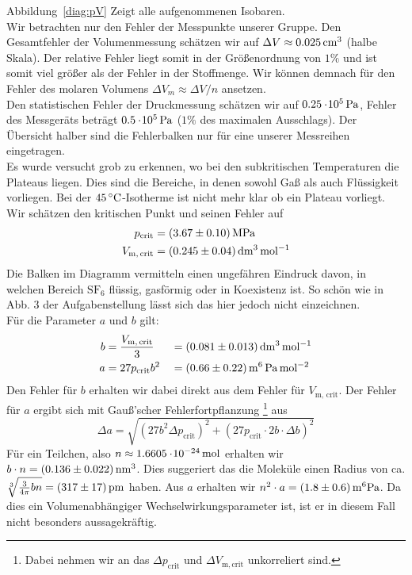 %
Abbildung~\ref{diag:pV} Zeigt alle aufgenommenen Isobaren. \\
%
Wir betrachten nur den Fehler der Messpunkte unserer Gruppe.
Den Gesamtfehler der Volumenmessung schätzen wir auf $\Delta V \approx \unit[0.025]{cm^3}$ (halbe Skala). Der relative Fehler liegt somit in der Größenordnung von $1\%$ und ist somit viel größer als der Fehler in der Stoffmenge. Wir können demnach für den Fehler des molaren Volumens $\Delta V_m \approx \Delta V / n$ ansetzen.\\
%
Den statistischen Fehler der Druckmessung schätzen wir auf $\unit[0.25 \e{5}]{Pa}$, Fehler des Messgeräts beträgt $\unit[0.5 \e5]{Pa}$ ($1\%$ des maximalen Ausschlags). 
Der Übersicht halber sind die Fehlerbalken nur für eine unserer Messreihen eingetragen.\\
%
Es wurde versucht grob zu erkennen, wo bei den subkritischen Temperaturen die Plateaus liegen. Dies sind die Bereiche, in denen sowohl Gaß als auch Flüssigkeit vorliegen. Bei der $\unit[45]{ ^\circ C}$-Isotherme ist nicht mehr klar ob ein Plateau vorliegt. Wir schätzen den kritischen Punkt und seinen Fehler auf
\begin{align*}
    p_\mathrm{crit} &= \unit[(3.67 \pm 0.10)]{MPa} \\
    V_\mathrm{m,\, crit} &= \unit[(0.245 \pm 0.04)]{dm^3\, mol^{-1}}
\end{align*}
%
Die Balken im Diagramm vermitteln einen ungefähren Eindruck davon, in welchen Bereich $\mathrm{S F_6}$ flüssig, gasförmig oder in Koexistenz ist. So schön wie in Abb. 3 der Aufgabenstellung lässt sich das hier jedoch nicht einzeichnen.\\
%
Für die Parameter $a$ und $b$ gilt:
%
\begin{alignat*}{3}
    b &= \frac{V_\mathrm{m,\, crit}}{3} &&= \unit[(0.081 \pm  0.013)]{dm^3\, mol^{-1}}\\
    a &= 27 p_\mathrm{crit} b^2 &&= \unit[(0.66 \pm 0.22)]{m^6\, Pa\, mol^{-2}}
\end{alignat*}
%
Den Fehler für $b$ erhalten wir dabei direkt aus dem Fehler für $V_\mathrm{m,\, crit}$. Der Fehler für $a$ ergibt sich mit Gauß'scher Fehlerfortpflanzung%
\footnote{Dabei nehmen wir an das $\Delta p_\mathrm{crit}$ und $\Delta V_\mathrm{m, crit}$ unkorreliert sind.}
aus
\[
    \Delta a = \sqrt{(27 b^2  \Delta p_\mathrm{crit})^2 +
                     (27 p_\mathrm{crit} \cdot 2 b \cdot \Delta b)^2}
\]
%
Für ein Teilchen, also $n \approx \unit[1.6605\e{-24}]{mol}$ erhalten wir $b \cdot n = \unit[(0.136 \pm 0.022)]{nm^3}$. Dies suggeriert das die Moleküle einen Radius von ca. $\sqrt[3]{\frac{3}{4\pi} b n} = \unit[(317 \pm 17)]{pm}$ haben. Aus $a$ erhalten wir $n^2 \cdot a = \unit[(1.8 \pm 0.6)]{m^6 Pa}$. Da dies ein Volumenabhängiger Wechselwirkungsparameter ist, ist er in diesem Fall nicht besonders aussagekräftig.


